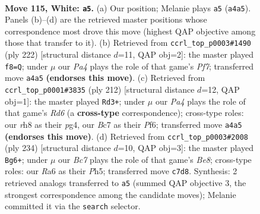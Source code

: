 \documentclass[11pt]{article}
\begin{document}
\clearpage

\begin{figure}[p]\centering
\begin{subfigure}{0.46\textwidth}\centering
\resizebox{\linewidth}{!}{%
\newchessgame
\chessboard[
  setfen={7r/2B4k/R7/8/P7/7K/8/8 w - - 3 115},
  showmover=false,
  pgfstyle=straightmove, color=movearrow, markmove={a4-a5}
]}
\caption{}
\end{subfigure}\hfill
\begin{subfigure}{0.46\textwidth}\centering
\resizebox{\linewidth}{!}{%
\newchessgame
\chessboard[
  setfen={8/4KP2/1rk5/8/8/8/8/8 w - - 2 112},
  showmover=false,
  pgfstyle=straightmove, color=movearrow, markmove={f7-f8}
]}
\caption{}
\end{subfigure}
\\[4pt]
\begin{subfigure}{0.46\textwidth}\centering
\resizebox{\linewidth}{!}{%
\newchessgame
\chessboard[
  setfen={8/8/3R1P2/8/6p1/5k2/r7/6K1 w - - 12 107},
  showmover=false,
  pgfstyle=straightmove, color=movearrow, markmove={d6-d3}
]}
\caption{}
\end{subfigure}\hfill
\begin{subfigure}{0.46\textwidth}\centering
\resizebox{\linewidth}{!}{%
\newchessgame
\chessboard[
  setfen={4B3/8/7p/5k1P/5r2/3K4/8/8 w - - 13 118},
  showmover=false,
  pgfstyle=straightmove, color=movearrow, markmove={e8-g6}
]}
\caption{}
\end{subfigure}
\caption{\textbf{Move 115, White: \texttt{a5}.} (a) Our position; Melanie plays \texttt{a5} (\texttt{a4a5}). Panels (b)--(d) are the retrieved master positions whose correspondence most drove this move (highest QAP objective among those that transfer to it). (b) Retrieved from \texttt{ccrl\_top\_p0003\#1490} (ply 222) [structural distance $d$=11, QAP obj=2]: the master played \texttt{f8=Q}; under $\mu$ our \emph{Pa4} plays the role of that game's \emph{Pf7}; transferred move \texttt{a4a5} \textbf{(endorses this move)}. (c) Retrieved from \texttt{ccrl\_top\_p0001\#3835} (ply 212) [structural distance $d$=12, QAP obj=1]: the master played \texttt{Rd3+}; under $\mu$ our \emph{Pa4} plays the role of that game's \emph{Rd6} (a \textbf{cross-type} correspondence); cross-type roles: our \emph{r}h8 as their \emph{p}g4, our \emph{B}c7 as their \emph{P}f6; transferred move \texttt{a4a5} \textbf{(endorses this move)}. (d) Retrieved from \texttt{ccrl\_top\_p0003\#2008} (ply 234) [structural distance $d$=10, QAP obj=3]: the master played \texttt{Bg6+}; under $\mu$ our \emph{Bc7} plays the role of that game's \emph{Be8}; cross-type roles: our \emph{R}a6 as their \emph{P}h5; transferred move \texttt{c7d8}. Synthesis: 2 retrieved analogs transferred to \texttt{a5} (summed QAP objective 3, the strongest correspondence among the candidate moves); Melanie committed it via the \texttt{search} selector.}
\label{fig:thought-m228}
\end{figure}
\end{document}

